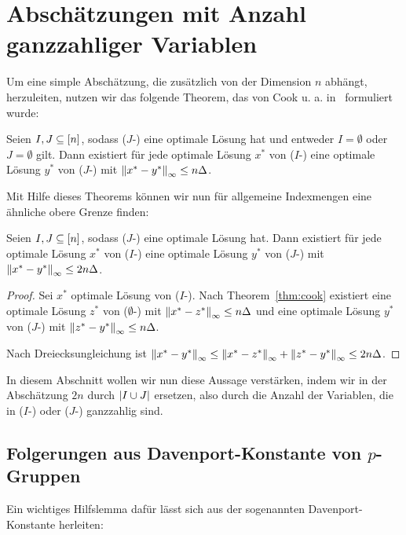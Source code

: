 
\section{Abschätzungen mit Anzahl ganzzahliger Variablen}

Um eine simple Abschätzung, die zusätzlich von der Dimension $n$ abhängt, herzuleiten, nutzen wir das folgende Theorem, das von Cook u. a. in~\cite[Theorem 1 und Bemerkung 1]{Cook1986} formuliert wurde:

\begin{theorem}[Cook u. a., 1986]\label{thm:cook}
	Seien $I, J\subseteq[n]$, sodass ($J$-\MIPR) eine optimale Lösung hat und entweder $I=\emptyset$ oder $J=\emptyset$ gilt.
	Dann existiert für jede optimale Lösung $x^*$ von ($I$-\MIPR) eine optimale Lösung $y^*$ von ($J$-\MIPR) mit $\left\lVert x^*-y^*\right\rVert_\infty\leq n\Delta$.
\end{theorem}

Mit Hilfe dieses Theorems können wir nun für allgemeine Indexmengen eine ähnliche obere Grenze finden:
\begin{corollary}
	Seien $I,J\subseteq[n]$, sodass ($J$-\MIPR) eine optimale Lösung
	hat.
	Dann existiert für jede optimale Lösung $x^*$ von ($I$-\MIPR) eine optimale Lösung $y^*$ von ($J$-\MIPR) mit $\left\lVert x^*-y^*\right\rVert_\infty\leq2 n\Delta$.
\end{corollary}
\begin{proof}
	Sei $x^*$ optimale Lösung von ($I$-\MIPR).
	Nach Theorem~\ref{thm:cook} existiert eine optimale Lösung $z^*$ von ($\emptyset$-\MIPR) mit $\left\lVert x^*-z^*\right\rVert_\infty\leq n\Delta$ und eine optimale Lösung $y^*$ von \mbox{($J$-\MIPR)} mit $\left\lVert z^*-y^*\right\rVert_\infty\leq n\Delta$.
	
	Nach Dreiecksungleichung ist $\left\lVert x^*-y^*\right\rVert_\infty\leq\left\lVert x^*-z^*\right\rVert_\infty+\left\lVert z^*-y^*\right\rVert_\infty\leq 2 n\Delta$.
\end{proof}

In diesem Abschnitt wollen wir nun diese Aussage verstärken, indem wir in der Abschätzung $2 n$ durch $\lvert I\cup J \rvert$ ersetzen, also durch die Anzahl der Variablen, die in ($I$-\MIPR) oder \mbox{($J$-\MIPR)} ganzzahlig sind.

\subsection{Folgerungen aus Davenport-Konstante von $p$-Gruppen}

Ein wichtiges Hilfslemma dafür lässt sich aus der sogenannten Davenport-Konstante herleiten:


